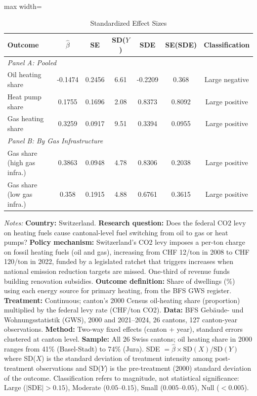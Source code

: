 \begin{table}[htbp]
\centering
\caption{Standardized Effect Sizes}
\label{tab:sde}
\begin{threeparttable}
\small
\begin{adjustbox}{max width=\textwidth}
\begin{tabular}{lcccccc}
\toprule
Outcome & $\hat{\beta}$ & SE & SD($Y$) & SDE & SE(SDE) & Classification \\
\midrule
\multicolumn{7}{l}{\textit{Panel A: Pooled}} \\
Oil heating share & -0.1474 & 0.2456 & 6.61 & -0.2209 & 0.368 & Large negative \\
Heat pump share & 0.1755 & 0.1696 & 2.08 & 0.8373 & 0.8092 & Large positive \\
Gas heating share & 0.3259 & 0.0917 & 9.51 & 0.3394 & 0.0955 & Large positive \\
\midrule
\multicolumn{7}{l}{\textit{Panel B: By Gas Infrastructure}} \\
Gas share (high gas infra.) & 0.3863 & 0.0948 & 4.78 & 0.8306 & 0.2038 & Large positive \\
Gas share (low gas infra.) & 0.358 & 0.1915 & 4.88 & 0.6761 & 0.3615 & Large positive \\
\bottomrule
\end{tabular}
\end{adjustbox}
\begin{tablenotes}[flushleft]
\footnotesize
\item \textit{Notes:} \textbf{Country:} Switzerland. \textbf{Research question:} Does the federal CO2 levy on heating fuels cause cantonal-level fuel switching from oil to gas or heat pumps? \textbf{Policy mechanism:} Switzerland's CO2 levy imposes a per-ton charge on fossil heating fuels (oil and gas), increasing from CHF 12/ton in 2008 to CHF 120/ton in 2022, funded by a legislated ratchet that triggers increases when national emission reduction targets are missed. One-third of revenue funds building renovation subsidies. \textbf{Outcome definition:} Share of dwellings (\%) using each energy source for primary heating, from the BFS GWS register. \textbf{Treatment:} Continuous; canton's 2000 Census oil-heating share (proportion) multiplied by the federal levy rate (CHF/ton CO2). \textbf{Data:} BFS Geb\"aude- und Wohnungsstatistik (GWS), 2000 and 2021--2024, 26 cantons, 127 canton-year observations. \textbf{Method:} Two-way fixed effects (canton + year), standard errors clustered at canton level. \textbf{Sample:} All 26 Swiss cantons; oil heating share in 2000 ranges from 41\% (Basel-Stadt) to 74\% (Jura). SDE $= \hat{\beta} \times \text{SD}(X) / \text{SD}(Y)$ where SD($X$) is the standard deviation of treatment intensity among post-treatment observations and SD($Y$) is the pre-treatment (2000) standard deviation of the outcome. Classification refers to magnitude, not statistical significance: Large ($|$SDE$| > 0.15$), Moderate ($0.05$--$0.15$), Small ($0.005$--$0.05$), Null ($< 0.005$).
\end{tablenotes}
\end{threeparttable}
\end{table}

